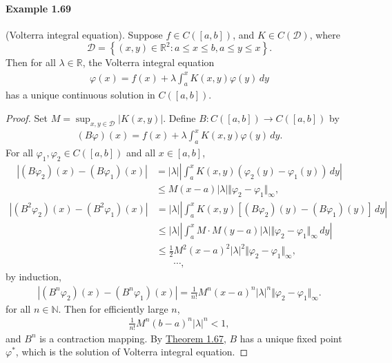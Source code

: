 \documentclass{article}
\begin{document}
\paragraph{Example 1.69\label{example:1.69}} (Volterra integral equation). Suppose $f\in C([a,b])$, and $K\in C(\mathcal{D})$, where $$\mathcal{D}=\left\{(x,y)\in\mathbb{R}^2:a\leq x\leq b, a\leq y\leq x\right\}.$$
Then for all $\lambda\in\mathbb{R}$, the Volterra integral equation
\begin{align*}
	\varphi(x) = f(x) +\lambda\int_a^x K(x,y)\varphi(y)\,dy
\end{align*}
has a unique continuous solution in $C([a,b])$.
\begin{proof}
Set $M=\sup_{x,y\in\mathcal{D}}\vert K(x,y)\vert$. Define $B:C([a,b])\to C([a,b])$ by
\begin{align*}
	(B\varphi)(x) = f(x) + \lambda\int_a^x K(x,y)\varphi(y)\,dy.
\end{align*}
For all $\varphi_1,\varphi_2\in C([a,b])$ and all $x\in[a,b]$,
\begin{align*}
	\left\vert(B\varphi_2)(x) - (B\varphi_1)(x)\right\vert &= \vert\lambda\vert\left\vert\int_a^x K(x,y)(\varphi_2(y)-\varphi_1(y))\,dy\right\vert\\
	&\leq M(x-a)\left\vert\lambda\right\vert\Vert\varphi_2-\varphi_1\Vert_\infty,
\end{align*}
\begin{align*}
	\left\vert(B^2\varphi_2)(x) - (B^2\varphi_1)(x)\right\vert &= \vert\lambda\vert\left\vert\int_a^x K(x,y)\left[(B\varphi_2)(y)-(B\varphi_1)(y)\right]\,dy\right\vert\\
	&\leq \left\vert\lambda\right\vert\left\vert\int_a^x M\cdot M(y-a)\left\vert\lambda\right\vert\Vert\varphi_2-\varphi_1\Vert_\infty\,dy\right\vert\\
	&\leq \frac{1}{2}M^2(x-a)^2\left\vert\lambda\right\vert^2\Vert \varphi_2-\varphi_1\Vert_\infty,
\end{align*}
\begin{align*}
	\cdots,
\end{align*}
by induction,
\begin{align*}
	\left\vert(B^n\varphi_2)(x) - (B^n\varphi_1)(x)\right\vert = \frac{1}{n!}M^n(x-a)^n\left\vert\lambda\right\vert^n\Vert \varphi_2-\varphi_1\Vert_\infty.
\end{align*}
for all $n\in\mathbb{N}$. Then for efficiently large $n$,
\begin{align*}
	\frac{1}{n!}M^n(b-a)^n\left\vert\lambda\right\vert^n < 1,
\end{align*}
and $B^n$ is a contraction mapping. By \hyperref[thm:1.67]{Theorem 1.67}, $B$ has a unique fixed point $\varphi^*$, which is the solution of Volterra integral equation.
\end{proof}
\end{document}
